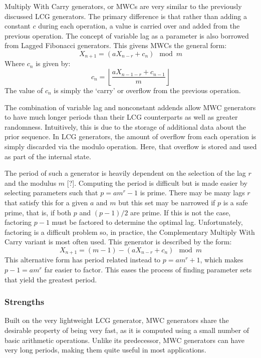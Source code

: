 \def\lc{\left\lfloor}   
\def\rc{\right\rfloor}

Multiply With Carry generators, or MWCs are very similar to the previously discussed LCG generators. The primary difference is that rather than adding a constant $c$ during each operation, a value is carried over and added from the previous operation. The concept of variable lag as a parameter is also borrowed from Lagged Fibonacci generators. This givens MWCs the general form:
\begin{equation} \label{eq:mwc}
    X_{n+1} = (aX_{n-r} + c_n) \mod m
\end{equation}
Where $c_n$ is given by:
\begin{equation} \label{eq:mwc_c}
    c_n = \lc \frac{aX_{n-1-r} + c_{n-1}}{m} \rc
\end{equation}
The value of $c_n$ is simply the `carry' or overflow from the previous operation.

The combination of variable lag and nonconstant addends allow MWC generators to have much longer periods than their LCG counterparts as well as greater randomness. Intuitively, this is due to the storage of additional data about the prior sequence. In LCG generators, the amount of overflow from each operation is simply discarded via the modulo operation. Here, that overflow is stored and used as part of the internal state.

The period of such a generator is heavily dependent on the selection of the lag $r$ and the modulus $m$ [?]. Computing the period is difficult but is made easier by selecting parameters such that $p=am^r-1$ is prime. There may be many lags $r$ that satisfy this for a given $a$ and $m$ but this set may be narrowed if $p$ is a safe prime, that is, if both $p$ and $(p-1)/2$ are prime. If this is not the case, factoring $p-1$ must be factored to determine the optimal lag. Unfortunately, factoring is a difficult problem so, in practice, the Complementary Multiply With Carry variant is most often used. This generator is described by the form:
\begin{equation} \label{eq:cmwc}
    X_{n+1} = (m-1) - (aX_{n-r} + c_n) \mod m
\end{equation}
This alternative form has period related instead to $p=am^r+1$, which makes $p-1 = am^r$ far easier to factor. This eases the process of finding parameter sets that yield the greatest period.

\subsubsection{Strengths}
Built on the very lightweight LCG generator, MWC generators share the desirable property of being very fast, as it is computed using a small number of basic arithmetic operations. Unlike its predecessor, MWC generators can have very long periods, making them quite useful in most applications.

